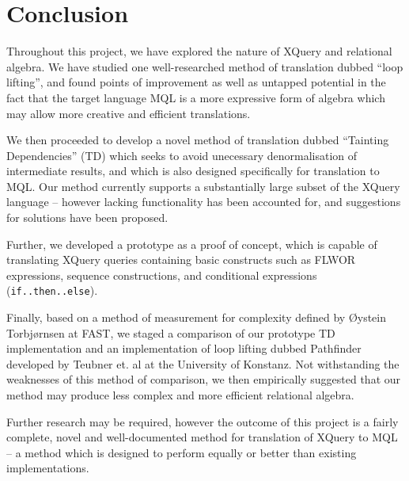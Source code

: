 \chapter{Conclusion}
\label{chapter:conclusion}
Throughout this project, we have explored the nature of XQuery and relational
algebra. We have studied one well-researched method of translation dubbed ``loop
lifting'', and found points of improvement as well as untapped potential in the
fact that the target language MQL is a more expressive form of algebra
which may allow more creative and efficient translations.

We then proceeded to develop a novel method of translation dubbed ``Tainting
Dependencies'' (TD) which seeks to avoid unecessary denormalisation of
intermediate results, and which is also designed specifically for translation
to MQL. Our method currently supports a substantially large subset of the XQuery
language -- however lacking functionality has been accounted for, and suggestions for
solutions have been proposed.

Further, we developed a prototype as a proof of concept, which is capable of
translating XQuery queries containing basic constructs such as FLWOR
expressions, sequence constructions, and conditional expressions (\texttt{if..then..else}).

Finally, based on a method of measurement for complexity defined by \O ystein
Torbj\o rnsen at FAST, we staged a comparison of our prototype TD implementation
and an implementation of loop lifting dubbed Pathfinder developed by Teubner
et. al at the University of Konstanz. Not withstanding the weaknesses of this
method of comparison, we then empirically suggested that our method may
produce less complex and more efficient relational algebra.

Further research may be required, however the outcome of this project is a
fairly complete, novel and well-documented method for translation of XQuery to
MQL -- a method which is designed to perform equally or better than existing
implementations.

% 
